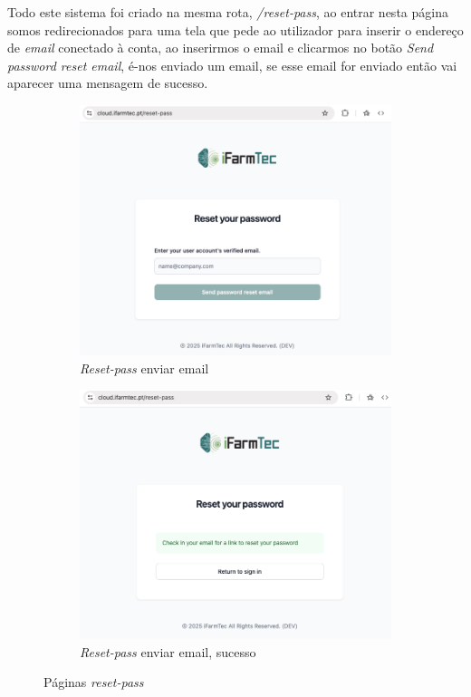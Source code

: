 Todo este sistema foi criado na mesma rota, \textit{/reset-pass}, ao entrar nesta página somos redirecionados para uma tela que pede ao utilizador para inserir o endereço de \textit{email} conectado à conta, ao inserirmos o email e clicarmos no botão \textit{Send password reset email}, é-nos enviado um email, se esse email for enviado então vai aparecer uma mensagem de sucesso.

\begin{figure}[!h]
	\centering
	\begin{subfigure}[c]{0.35\textwidth}
		\centering
		\includegraphics[width=\textwidth]{figs/reset-pass-1.png}
		\caption{\textit{Reset-pass} enviar email}
		\label{fig:resetPassEmail}
	\end{subfigure}
	\hfill
	\begin{subfigure}[c]{0.35\textwidth}
		\centering
		\includegraphics[width=\textwidth]{figs/reset-pass-2.png}
		\caption{\textit{Reset-pass} enviar email, sucesso}
		\label{fig:resetPassEmailSuc}
	\end{subfigure}
	\caption{Páginas \textit{reset-pass}}
    \label{fig:pagResetPass}
\end{figure}

